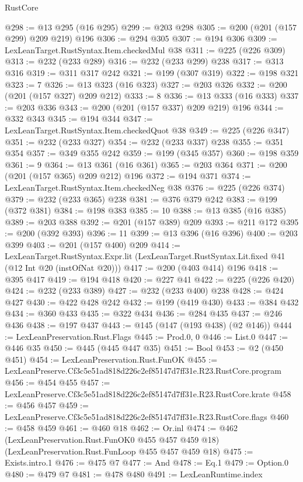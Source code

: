 \begin{lexlean}{RustCore}
\begin{coremodule}
@298 := @13 @295 (@16 @295)
@299 := @203 @298
@305 := @200 (@201 (@157 @299) @209 @219) @196
@306 := @294 @305
@307 := @194 @306
@309 := LexLeanTarget.RustSyntax.Item.checkedMul @38
@311 := @225 (@226 @309)
@313 := @232 (@233 @289)
@316 := @232 (@233 @299) @238
@317 := @313 @316
@319 := @311 @317 @242
@321 := @199 (@307 @319)
@322 := @198 @321
@323 := 7
@326 := @13 @323 (@16 @323)
@327 := @203 @326
@332 := @200 (@201 (@157 @327) @209 @212)
@333 := 8
@336 := @13 @333 (@16 @333)
@337 := @203 @336
@343 := @200 (@201 (@157 @337) @209 @219) @196
@344 := @332 @343
@345 := @194 @344
@347 := LexLeanTarget.RustSyntax.Item.checkedQuot @38
@349 := @225 (@226 @347)
@351 := @232 (@233 @327)
@354 := @232 (@233 @337) @238
@355 := @351 @354
@357 := @349 @355 @242
@359 := @199 (@345 @357)
@360 := @198 @359
@361 := 9
@364 := @13 @361 (@16 @361)
@365 := @203 @364
@371 := @200 (@201 (@157 @365) @209 @212) @196
@372 := @194 @371
@374 := LexLeanTarget.RustSyntax.Item.checkedNeg @38
@376 := @225 (@226 @374)
@379 := @232 (@233 @365) @238
@381 := @376 @379 @242
@383 := @199 (@372 @381)
@384 := @198 @383
@385 := 10
@388 := @13 @385 (@16 @385)
@389 := @203 @388
@392 := @201 (@157 @389) @209
@393 := @211 @172
@395 := @200 (@392 @393)
@396 := 11
@399 := @13 @396 (@16 @396)
@400 := @203 @399
@403 := @201 (@157 @400) @209
@414 := LexLeanTarget.RustSyntax.Expr.lit
    (LexLeanTarget.RustSyntax.Lit.fixed @41 (@12 Int @20 (instOfNat @20)))
@417 := @200 (@403 @414) @196
@418 := @395 @417
@419 := @194 @418
@420 := @227 @41
@422 := @225 (@226 @420)
@424 := @232 (@233 @389)
@427 := @232 (@233 @400) @238
@428 := @424 @427
@430 := @422 @428 @242
@432 := @199 (@419 @430)
@433 := @384 @432
@434 := @360 @433
@435 := @322 @434
@436 := @284 @435
@437 := @246 @436
@438 := @197 @437
@443 := @145 (@147 (@193 @438) (@2 @146))
@444 := LexLeanPreservation.Rust.Flags
@445 := Prod.{0, 0}
@446 := List.{0}
@447 := @446 @35
@450 := @445 (@445 @447 @35)
@451 := Bool
@453 := @2 (@450 @451)
@454 := LexLeanPreservation.Rust.FunOK
@455 := LexLeanPreserve.Cf3c5e51ad818d226c2ef85147d7ff31e.R23.RustCore.program
@456 := @454 @455
@457 := LexLeanPreserve.Cf3c5e51ad818d226c2ef85147d7ff31e.R23.RustCore.krate
@458 := @456 @457
@459 := LexLeanPreserve.Cf3c5e51ad818d226c2ef85147d7ff31e.R23.RustCore.flags
@460 := @458 @459
@461 := @460 @18
@462 := Or.inl
@474 := @462
    (LexLeanPreservation.Rust.FunOK0 @455 @457 @459 @18)
    (LexLeanPreservation.Rust.FunLoop @455 @457 @459 @18)
@475 := Exists.intro.{1}
@476 := @475 @7
@477 := And
@478 := Eq.{1}
@479 := Option.{0}
@480 := @479 @7
@481 := @478 @480
@491 := LexLeanRuntime.index

\end{coremodule}
\end{lexlean}
